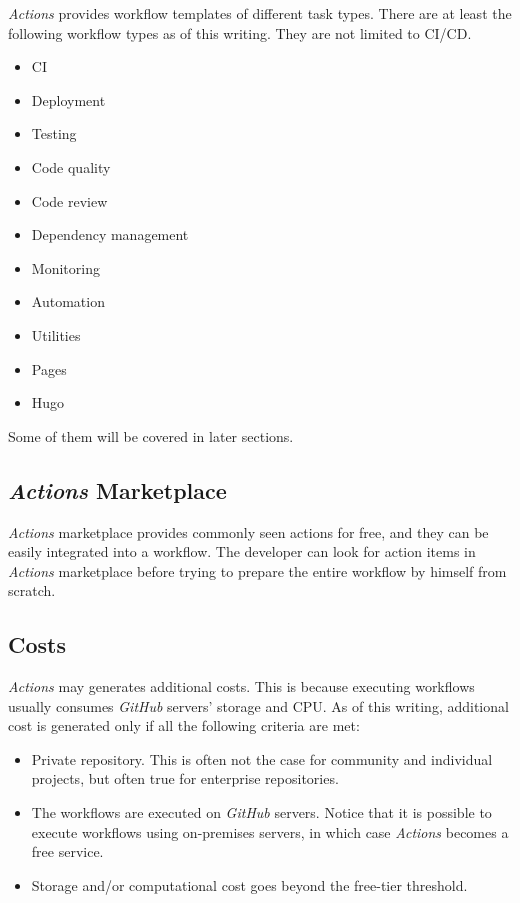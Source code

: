 \textit{Actions} provides workflow templates of different task types. There are at least the following workflow types as of this writing. They are not limited to CI/CD.
\begin{itemize}
	\item CI
	\item Deployment
	\item Testing
	\item Code quality
	\item Code review
	\item Dependency management
	\item Monitoring
	\item Automation
	\item Utilities
	\item Pages
	\item Hugo
\end{itemize}
Some of them will be covered in later sections.

\subsection{\textit{Actions} Marketplace}

\textit{Actions} marketplace provides commonly seen actions for free, and they can be easily integrated into a workflow. The developer can look for action items in \textit{Actions} marketplace before trying to prepare the entire workflow by himself from scratch.

\subsection{Costs}

\textit{Actions} may generates additional costs. This is because executing workflows usually consumes \textit{GitHub} servers' storage and CPU. As of this writing, additional cost is generated only if all the following criteria are met:
\begin{itemize}
	\item Private repository. This is often not the case for community and individual projects, but often true for enterprise repositories.
	\item The workflows are executed on \textit{GitHub} servers. Notice that it is possible to execute workflows using on-premises servers, in which case \textit{Actions} becomes a free service.
	\item Storage and/or computational cost goes beyond the free-tier threshold.
\end{itemize}

